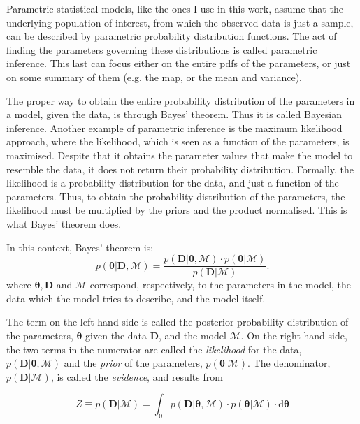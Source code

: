 {Parametric statistical models, like the ones I use in this work, assume that the underlying population of interest, from which the observed data is just a sample, can be described by parametric probability distribution functions. The act of finding the parameters governing these distributions is called parametric inference. This last can focus either on the entire \glspl{pdf} of the parameters, or just on some summary of them (e.g. the  \gls{map}, or the mean and variance).}

The proper way to obtain the entire probability distribution of the parameters in a model, given the data, is through Bayes' theorem. Thus it is called Bayesian inference. Another example of parametric inference is the maximum likelihood approach, where the likelihood, which is seen as a function of the parameters, is maximised. Despite that it obtains the parameter values that make the model to resemble the data, it does not return their probability distribution. Formally, the likelihood is a probability distribution for the data, and just a function of the parameters. Thus, to obtain the probability distribution of the parameters, the likelihood must be multiplied by the priors and the product normalised. This is what Bayes' theorem does.

In this context, Bayes' theorem is:
\begin{equation}
p(\boldsymbol{\theta}|\mathbf{D},\mathcal{M}) = \frac{p(\mathbf{D}|\boldsymbol{\theta},\mathcal{M})\cdot p(\boldsymbol{\theta}|\mathcal{M})}{p(\mathbf{D}|\mathcal{M})}.
\end{equation}
where $\boldsymbol{\theta},\mathbf{D}$ and $\mathcal{M}$ correspond, respectively, to the parameters in the model, the data which the model tries to describe, and the model itself. 

The term on the {left-hand side} is called the posterior probability distribution of the parameters, $\boldsymbol{\theta}$ given the data $\mathbf{D}$, and the model $\mathcal{M}$. On the right hand side, the two terms in the numerator are called the \emph{likelihood} for the data, $p(\mathbf{D}|\boldsymbol{\theta},\mathcal{M})$ and the \emph{prior} of the parameters, $p(\boldsymbol{\theta}|\mathcal{M})$. The denominator, $p(\mathbf{D}|\mathcal{M})$, is called the \emph{evidence}, and results from

\begin{equation}
\label{eq:evidence}
Z \equiv p(\mathbf{D}|\mathcal{M}) = \int_{\boldsymbol{\theta}} p(\mathbf{D}|\boldsymbol{\theta},\mathcal{M})\cdot p(\boldsymbol{\theta}|\mathcal{M})\cdot \mathrm{d}\boldsymbol{\theta}
\end{equation} 

